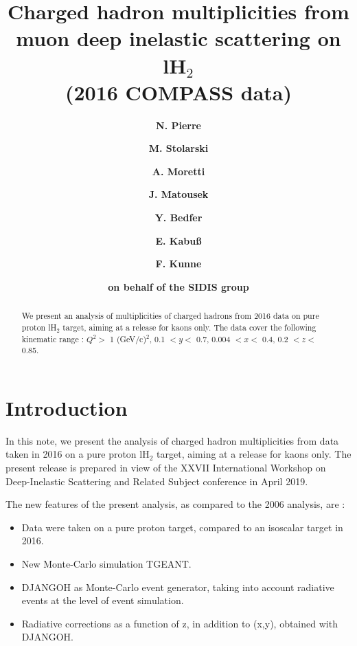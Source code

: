\documentclass[letterpaper,12pt]{article}
\begin{document}
\title{\textbf{Charged hadron multiplicities from muon deep inelastic scattering on lH$_2$ \\ (2016 COMPASS data)}}
\author[1,2]{\textbf{N. Pierre}}
\author[3]{\textbf{M. Stolarski}}
\author[4]{\textbf{A. Moretti}}
\author[4]{\textbf{J. Matousek}}
\author[1]{\textbf{Y. Bedfer}}
\author[2]{\textbf{E. Kabu{\ss}}}
\author[1]{\textbf{F. Kunne}}
\author[ ]{\textbf{on behalf of the SIDIS group}}

\maketitle

\begin{abstract}
  We present an analysis of multiplicities of charged hadrons from 2016 data on pure proton lH$_2$ target, aiming at a release for kaons only.
  The data cover the following kinematic range : $Q^2 >$ 1 (GeV/c)$^2$, 0.1 $< y <$ 0.7, 0.004 $< x <$ 0.4,
  0.2 $< z <$ 0.85.
\end{abstract}

\newpage

\section{Introduction} \label{Intro}

In this note, we present the analysis of charged hadron multiplicities from data taken in 2016 on a pure proton lH$_2$ target, aiming at a release for kaons only.
The present release is prepared in view of the XXVII International Workshop on Deep-Inelastic Scattering and Related Subject conference in April 2019.

The new features of the present analysis, as compared to the 2006 analysis\cite{COMPASS2006P,COMPASS2006K}, are :
\begin{itemize}
	\item Data were taken on a pure proton target, compared to an isoscalar target in 2016.
	\item New Monte-Carlo simulation TGEANT.
	\item DJANGOH as Monte-Carlo event generator, taking into account radiative events at the level of event simulation\cite{DJANGOH_NOTE}.
	\item Radiative corrections as a function of z, in addition to (x,y), obtained with DJANGOH.
\end{itemize}
\end{document}

